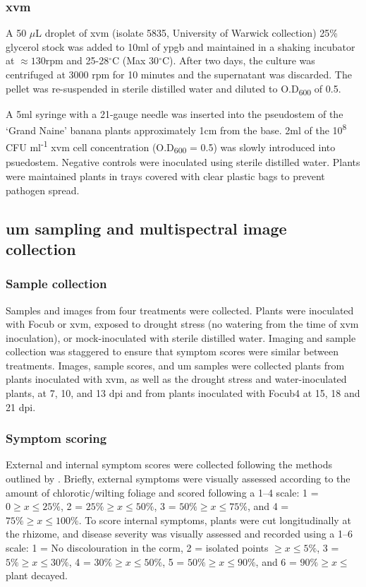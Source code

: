 \subsubsection{\acl{xvm}}
A 50 \(\mu\)L droplet of \acf{xvm} (isolate 5835, University of Warwick collection) 25\% glycerol stock was added to 10ml of \ac{ypgb} and maintained in a shaking incubator at $\approx130$rpm and 25-28$^{\circ}$C (Max 30$^{\circ}$C). After two days, the culture was centrifuged at 3000 \ac{rpm} for 10 minutes and the supernatant was discarded. The pellet was re-suspended in sterile distilled water and diluted to O.D\textsubscript{600} of 0.5. 

A 5ml syringe with a 21-gauge needle was inserted into the pseudostem of the ‘Grand Naine’ banana plants approximately 1cm from the base. 2ml of the 10\textsuperscript{8} CFU ml\textsuperscript{-1} \ac{xvm} cell concentration (O.D\textsubscript{600} = 0.5) was slowly introduced into psuedostem. Negative controls were inoculated using sterile distilled water. Plants were maintained plants in trays covered with clear plastic bags to prevent pathogen spread. 

\subsection{\Acl{um} sampling and multispectral image collection}
\subsubsection{Sample collection}
Samples and images from four treatments were collected. Plants were inoculated with \ac{Focub} or \ac{xvm}, exposed to drought stress (no watering from the time of \ac{xvm} inoculation), or mock-inoculated with sterile distilled water. Imaging and sample collection was staggered to ensure that symptom scores were similar between treatments. Images, sample scores, and \ac{um} samples were collected plants from plants inoculated with \ac{xvm}, as well as the drought stress and water-inoculated plants, at 7, 10, and 13 \ac{dpi} and from plants inoculated with \ac{Focub4} at 15, 18 and 21 \ac{dpi}. 

\subsubsection{Symptom scoring}
External and internal symptom scores were collected following the methods outlined by \textcite{Garcia-Bastidas2019}. Briefly, external symptoms were visually assessed according to the amount of chlorotic/wilting foliage and scored following a 1–4 scale: 1 =  $0\ge x \leq25\%$, 2 = $25\%\ge x \leq50\%$, 3 = $50\%\ge x \leq75\%$, and 4 = $75\%\ge x \leq100\%$. To score internal symptoms, plants were cut longitudinally at the rhizome, and disease severity was visually assessed and recorded using a 1–6 scale:  1 = No discolouration in the corm, 2 = isolated points $\ge x \leq5\%$, 3 = $5\%\ge x \leq30\%$, 4 = $30\%\ge x \leq50\%$, 5 = $50\%\ge x \leq90\%$, and 6 = $90\%\ge x \leq$ plant decayed. 


